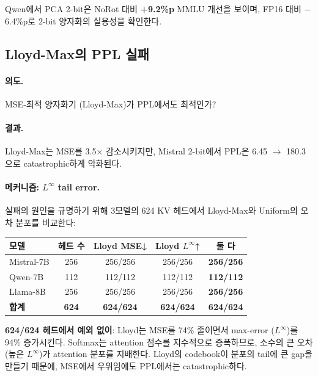 Qwen에서 PCA 2-bit은 NoRot 대비 \textbf{+9.2\%p} MMLU 개선을 보이며, FP16 대비 $-$6.4\%p로 2-bit 양자화의 실용성을 확인한다.


\subsection{Lloyd-Max의 PPL 실패}
\label{sec:exp_lloyd}

\paragraph{의도.} MSE-최적 양자화기 (Lloyd-Max)가 PPL에서도 최적인가?

\paragraph{결과.} Lloyd-Max는 MSE를 3.5$\times$ 감소시키지만, Mistral 2-bit에서 PPL은 6.45 $\to$ 180.3으로 catastrophic하게 악화된다.

\paragraph{메커니즘: $L^\infty$ tail error.} 실패의 원인을 규명하기 위해 3모델의 624 KV 헤드에서 Lloyd-Max와 Uniform의 오차 분포를 비교한다:

\begin{center}
\small
\begin{tabular}{@{}lcccc@{}}
\toprule
모델 & 헤드 수 & Lloyd MSE↓ & Lloyd $L^\infty$↑ & 둘 다 \\
\midrule
Mistral-7B & 256 & 256/256 & 256/256 & \textbf{256/256} \\
Qwen-7B & 112 & 112/112 & 112/112 & \textbf{112/112} \\
Llama-8B & 256 & 256/256 & 256/256 & \textbf{256/256} \\
\midrule
\textbf{합계} & \textbf{624} & \textbf{624/624} & \textbf{624/624} & \textbf{624/624} \\
\bottomrule
\end{tabular}
\end{center}

\textbf{624/624 헤드에서 예외 없이}: Lloyd는 MSE를 74\% 줄이면서 max-error ($L^\infty$)를 94\% 증가시킨다. Softmax는 attention 점수를 지수적으로 증폭하므로, 소수의 큰 오차 (높은 $L^\infty$)가 attention 분포를 지배한다. Lloyd의 codebook이 분포의 tail에 큰 gap을 만들기 때문에, MSE에서 우위임에도 PPL에서는 catastrophic하다.


